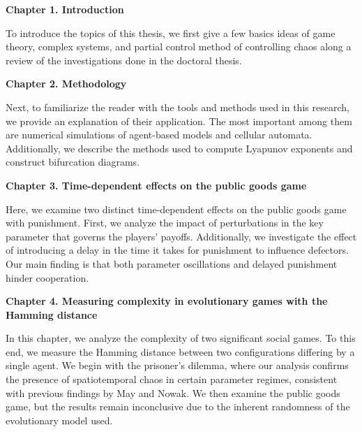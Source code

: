 
\clearpage

{\bf  Chapter 1. Introduction}

To introduce the topics of this thesis, we first give a few basics ideas of game theory, complex systems, and partial control method of controlling chaos along a review of the investigations done in the doctoral thesis.

\vspace{0.6cm}

{\bf  Chapter 2. Methodology}

Next, to familiarize the reader with the tools and methods used in this research, we provide an explanation of their application. The most important among them are numerical simulations of agent-based models and cellular automata. Additionally, we describe the methods used to compute Lyapunov exponents and construct bifurcation diagrams.


\vspace{0.6cm}

{\bf  Chapter 3. Time-dependent effects on the public goods game}  
\vspace{0.6cm}

Here, we examine two distinct time-dependent effects on the public goods game with punishment. First, we analyze the impact of perturbations in the key parameter that governs the players' payoffs. Additionally, we investigate the effect of introducing a delay in the time it takes for punishment to influence defectors. Our main finding is that both parameter oscillations and delayed punishment hinder cooperation.


\vspace{0.6cm}

{\bf  Chapter 4. Measuring complexity in evolutionary games with the Hamming distance}  
\vspace{0.6cm}

In this chapter, we analyze the complexity of two significant social games. To this end, we measure the Hamming distance between two configurations differing by a single agent. We begin with the prisoner's dilemma, where our analysis confirms the presence of spatiotemporal chaos in certain parameter regimes, consistent with previous findings by May and Nowak. We then examine the public goods game, but the results remain inconclusive due to the inherent randomness of the evolutionary model used.


\vspace{0.6cm}

